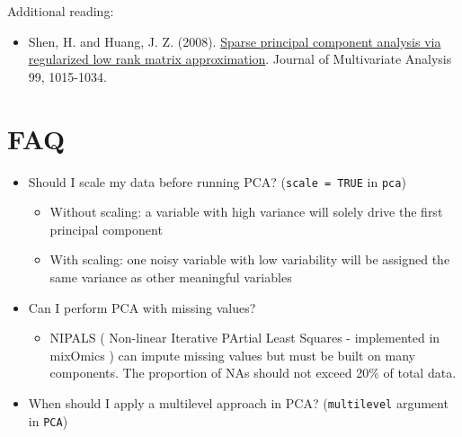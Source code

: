 \documentclass[]{book}
\providecommand{\tightlist}{%
  \setlength{\itemsep}{0pt}\setlength{\parskip}{0pt}}
\theoremstyle{definition}
\theoremstyle{definition}
\theoremstyle{definition}
\theoremstyle{remark}
\begin{document}
Additional reading:

\begin{itemize}
\tightlist
\item
  Shen, H. and Huang, J. Z. (2008).
  \href{https://www.sciencedirect.com/science/article/pii/S0047259X07000887}{Sparse
  principal component analysis via regularized low rank matrix
  approximation}. Journal of Multivariate Analysis 99, 1015-1034.
\end{itemize}

\section{FAQ}\label{faq}

\begin{itemize}
\tightlist
\item
  Should I scale my data before running PCA? (\texttt{scale\ =\ TRUE} in
  \texttt{pca})

  \begin{itemize}
  \tightlist
  \item
    Without scaling: a variable with high variance will solely drive the
    first principal component
  \item
    With scaling: one noisy variable with low variability will be
    assigned the same variance as other meaningful variables
  \end{itemize}
\item
  Can I perform PCA with missing values?

  \begin{itemize}
  \tightlist
  \item
    NIPALS ( Non-linear Iterative PArtial Least Squares - implemented in
    mixOmics ) can impute missing values but must be built on many
    components. The proportion of NAs should not exceed 20\% of total
    data.
  \end{itemize}
\item
  When should I apply a multilevel approach in PCA? (\texttt{multilevel}
  argument in \texttt{PCA})


\end{itemize}
\end{document}

